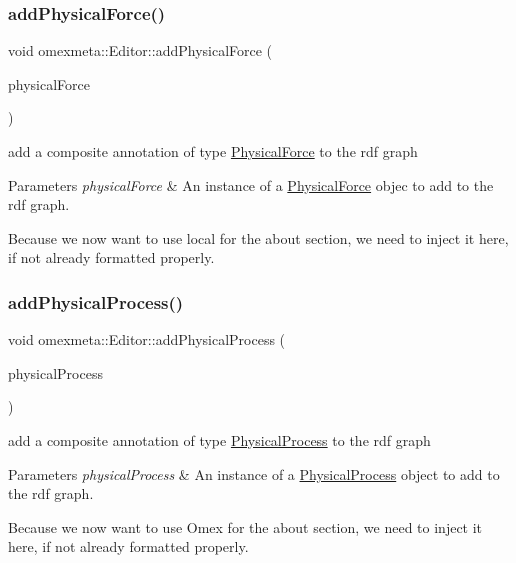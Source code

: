 \subsubsection{\texorpdfstring{add\+Physical\+Force()}{addPhysicalForce()}}
{\footnotesize\ttfamily void omexmeta\+::\+Editor\+::add\+Physical\+Force (\begin{DoxyParamCaption}\item[{\hyperlink{classomexmeta_1_1PhysicalForce}{Physical\+Force} \&}]{physical\+Force }\end{DoxyParamCaption})}



add a composite annotation of type \hyperlink{classomexmeta_1_1PhysicalForce}{Physical\+Force} to the rdf graph 


\begin{DoxyParams}{Parameters}
{\em physical\+Force} & An instance of a \hyperlink{classomexmeta_1_1PhysicalForce}{Physical\+Force} objec to add to the rdf graph. \\
\hline
\end{DoxyParams}
Because we now want to use  local for the about section, we need to inject it here, if not already formatted properly.\mbox{\label{classomexmeta_1_1Editor_ae4a608ecbe64f05c1b64efbeeb1fdeb1}} 
\subsubsection{\texorpdfstring{add\+Physical\+Process()}{addPhysicalProcess()}}
{\footnotesize\ttfamily void omexmeta\+::\+Editor\+::add\+Physical\+Process (\begin{DoxyParamCaption}\item[{\hyperlink{classomexmeta_1_1PhysicalProcess}{Physical\+Process} \&}]{physical\+Process }\end{DoxyParamCaption})}



add a composite annotation of type \hyperlink{classomexmeta_1_1PhysicalProcess}{Physical\+Process} to the rdf graph 


\begin{DoxyParams}{Parameters}
{\em physical\+Process} & An instance of a \hyperlink{classomexmeta_1_1PhysicalProcess}{Physical\+Process} object to add to the rdf graph. \\
\hline
\end{DoxyParams}
Because we now want to use  Omex for the about section, we need to inject it here, if not already formatted properly.\mbox{\label{classomexmeta_1_1Editor_a533f93c8ae0c3081dfe2fc8e8ebee8ea}} 
